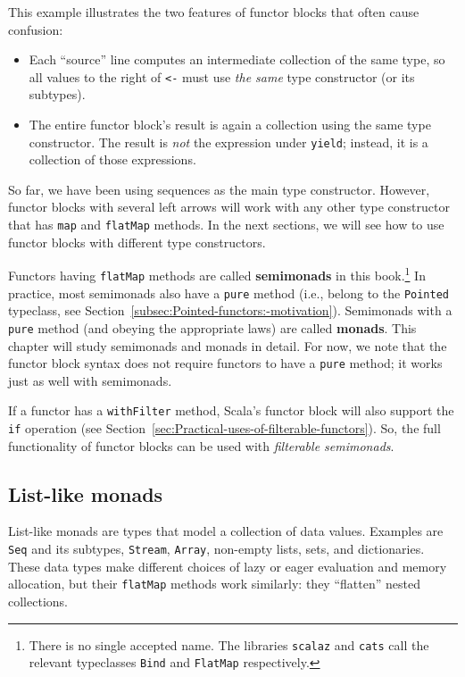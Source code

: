 \vspace{0.2\baselineskip}
This example illustrates the two features of functor blocks that often
cause confusion:
\begin{itemize}
\item Each \textsf{``}source\textsf{''} line computes an intermediate collection of the
same type, so all values to the right of \lstinline!<-! must use
\emph{the same} type constructor (or its subtypes).
\item The entire functor block\textsf{'}s result is again a collection using the
same type constructor. The result is \emph{not} the expression under
\lstinline!yield!; instead, it is a collection of those expressions.
\end{itemize}
So far, we have been using sequences as the main type constructor.
However, functor blocks with several left arrows will work with any
other type constructor that has \lstinline!map! and \lstinline!flatMap!
methods. In the next sections, we will see how to use functor blocks
with different type constructors. 

Functors having \lstinline!flatMap! methods are called \textbf{semimonads}
in this book.\footnote{There is no single accepted name. The libraries \texttt{scalaz} and
\texttt{cats} call the relevant typeclasses \lstinline!Bind! and
\lstinline!FlatMap! respectively.} In practice, most semimonads also have a \lstinline!pure! method
(i.e., belong to the \lstinline!Pointed! typeclass, see Section~\ref{subsec:Pointed-functors:-motivation}).
Semimonads with a \lstinline!pure! method (and obeying the appropriate
laws) are called \textbf{monads}. This chapter will
study semimonads and monads in detail. For now, we note that the functor
block syntax does not require functors to have a \lstinline!pure!
method; it works just as well with semimonads.

If a functor has a \lstinline!withFilter! method, Scala\textsf{'}s functor
block will also support the \lstinline!if! operation (see Section~\ref{sec:Practical-uses-of-filterable-functors}).
So, the full functionality of functor blocks can be used with \emph{filterable
semimonads}.

\subsection{List-like monads}

List-like monads are types that model a collection of data values.
Examples are \lstinline!Seq! and its subtypes, \lstinline!Stream!,
\lstinline!Array!, non-empty lists, sets, and dictionaries. These
data types make different choices of lazy or eager evaluation and
memory allocation, but their \lstinline!flatMap! methods work similarly:
they \textsf{``}flatten\textsf{''} nested collections. 

